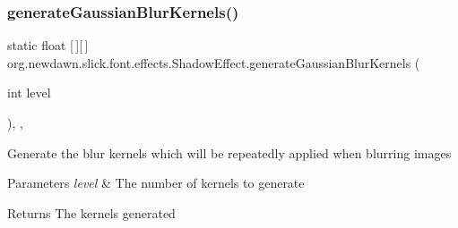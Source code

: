 \mbox{\label{classorg_1_1newdawn_1_1slick_1_1font_1_1effects_1_1_shadow_effect_a52516d25971f838f5cc677a3efe09eff}} 
\subsubsection{\texorpdfstring{generate\+Gaussian\+Blur\+Kernels()}{generateGaussianBlurKernels()}}
{\footnotesize\ttfamily static float \mbox{[}$\,$\mbox{]}\mbox{[}$\,$\mbox{]} org.\+newdawn.\+slick.\+font.\+effects.\+Shadow\+Effect.\+generate\+Gaussian\+Blur\+Kernels (\begin{DoxyParamCaption}\item[{int}]{level }\end{DoxyParamCaption})\hspace{0.3cm}{\ttfamily [inline]}, {\ttfamily [static]}, {\ttfamily [private]}}

Generate the blur kernels which will be repeatedly applied when blurring images


\begin{DoxyParams}{Parameters}
{\em level} & The number of kernels to generate \\
\hline
\end{DoxyParams}
\begin{DoxyReturn}{Returns}
The kernels generated 
\end{DoxyReturn}

